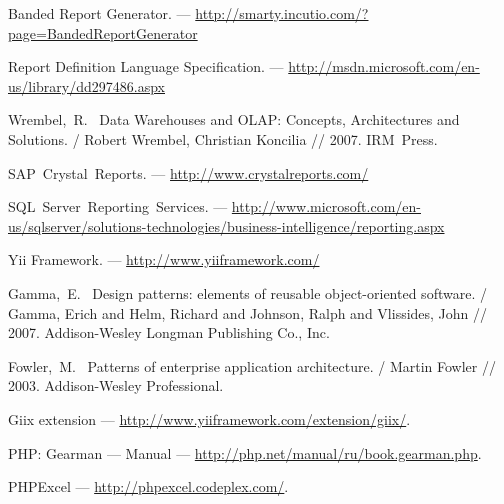 Banded Report Generator. --- \url{http://smarty.incutio.com/?page=BandedReportGenerator}

Report Definition Language Specification. --- \url{http://msdn.microsoft.com/en-us/library/dd297486.aspx}

Wrembel,~R.~
Data Warehouses and OLAP: Concepts, Architectures and Solutions. /
Robert Wrembel, Christian Koncilia //
2007. IRM~Press.

SAP~Crystal~Reports. --- \url{http://www.crystalreports.com/}

SQL~Server~Reporting~Services. --- \url{http://www.microsoft.com/en-us/sqlserver/solutions-technologies/business-intelligence/reporting.aspx}

Yii Framework. --- \url{http://www.yiiframework.com/}

Gamma,~E.~
Design patterns: elements of reusable object-oriented software. /
Gamma, Erich and Helm, Richard and Johnson, Ralph and Vlissides, John //
2007. Addison-Wesley Longman Publishing Co., Inc.

Fowler,~M.~
Patterns of enterprise application architecture. /
Martin Fowler //
2003. Addison-Wesley Professional.

Giix extension --- \url{http://www.yiiframework.com/extension/giix/}.

PHP: Gearman --- Manual --- \url{http://php.net/manual/ru/book.gearman.php}.

PHPExcel --- \url{http://phpexcel.codeplex.com/}.
